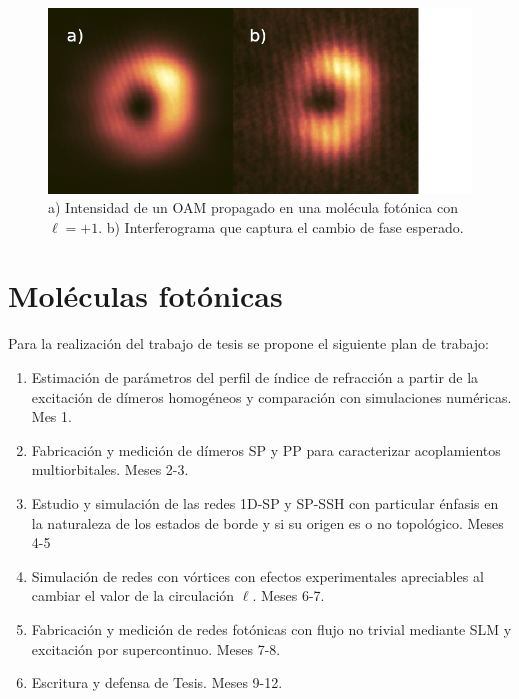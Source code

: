\documentclass[12pt, letterpaper]{article}
\begin{document}
\begin{figure}[H]
	\centering
	\includegraphics[width=0.5\linewidth]{./media/vortex.png}
	\caption{a) Intensidad de un OAM propagado en una molécula fotónica con $\ell = +1$. b) Interferograma que captura el cambio de fase esperado. \label{fig:vortex}}
\end{figure} 

\section{Moléculas fotónicas}

Para la realización del trabajo de tesis se propone el siguiente plan de trabajo:

\begin{enumerate}
	\item Estimación de parámetros del perfil de índice de refracción a partir de la excitación de dímeros homogéneos y comparación con simulaciones numéricas. Mes 1.
	\item Fabricación y medición de dímeros SP y PP para caracterizar acoplamientos multiorbitales. Meses 2-3.
	\item Estudio y simulación de las redes 1D-SP y SP-SSH con particular énfasis en la naturaleza de los estados de borde y si su origen es o no topológico. Meses 4-5
	\item Simulación de redes con vórtices con efectos experimentales apreciables al cambiar el valor de la circulación $\ell$. Meses 6-7.
	\item Fabricación y medición de redes fotónicas con flujo no trivial mediante SLM y excitación por supercontinuo. Meses 7-8.
	\item Escritura y defensa de Tesis. Meses 9-12.
\end{enumerate}


\renewcommand\refname{Referencias}




\end{document}
